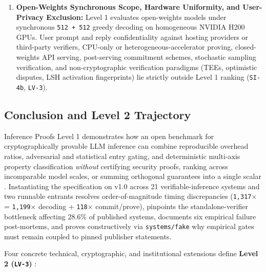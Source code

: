 \documentclass[11pt,letterpaper]{article}
\begin{document}
\begin{enumerate}
\item \textbf{Open-Weights Synchronous Scope, Hardware Uniformity, and User-Privacy Exclusion:} Level 1 evaluates open-weights models under synchronous \texttt{512 + 512} greedy decoding on homogeneous NVIDIA H200 GPUs. User prompt and reply confidentiality against hosting providers or third-party verifiers, CPU-only or heterogeneous-accelerator proving, closed-weights API serving, post-serving commitment schemes, stochastic sampling verification, and non-cryptographic verification paradigms (TEEs, optimistic disputes, LSH activation fingerprints) lie strictly outside Level 1 ranking (\texttt{SI-4b}, \texttt{LV-3}).
\end{enumerate}

\subsection{Conclusion and Level 2 Trajectory}

Inference Proofs Level 1 demonstrates how an open benchmark for cryptographically provable LLM inference can combine reproducible overhead ratios, adversarial and statistical entry gating, and deterministic multi-axis property classification \textit{without} certifying security proofs, ranking across incomparable model scales, or summing orthogonal guarantees into a single scalar \cite{iproofs2026}. Instantiating the specification on v1.0 across 21 verifiable-inference systems and two runnable entrants resolves order-of-magnitude timing discrepancies (\texttt{1,317$\times$} = \texttt{1,199$\times$} decoding + \texttt{118$\times$} commit/prove), pinpoints the standalone-verifier bottleneck affecting 28.6\% of published systems, documents six empirical failure post-mortems, and proves constructively via \texttt{systems/\allowbreak{}fake} why empirical gates must remain coupled to pinned publisher statements.

Four concrete technical, cryptographic, and institutional extensions define \textbf{Level 2 (\texttt{LV-3})} \cite{iproofs2026}:
\end{document}

